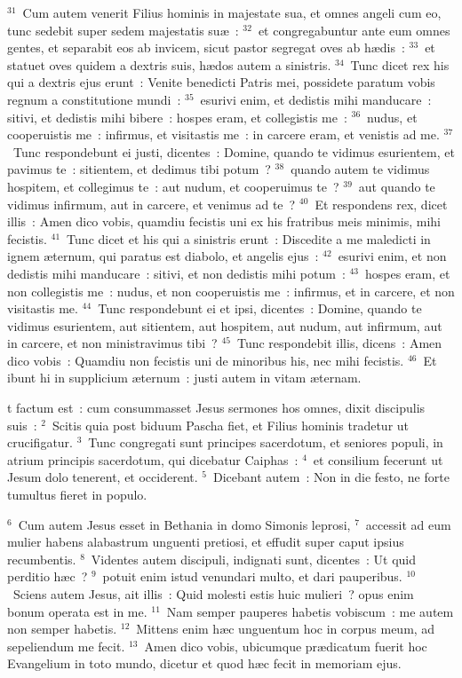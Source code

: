 ${}^{31}$~Cum autem venerit Filius hominis in majestate sua, et omnes angeli cum eo, tunc sedebit super sedem majestatis su\ae~:
${}^{32}$~et congregabuntur ante eum omnes gentes, et separabit eos ab invicem, sicut pastor segregat oves ab h\ae dis~:
${}^{33}$~et statuet oves quidem a dextris suis, h\ae dos autem a sinistris.
${}^{34}$~Tunc dicet rex his qui a dextris ejus erunt~: Venite benedicti Patris mei, possidete paratum vobis regnum a constitutione mundi~:
${}^{35}$~esurivi enim, et dedistis mihi manducare~: sitivi, et dedistis mihi bibere~: hospes eram, et collegistis me~:
${}^{36}$~nudus, et cooperuistis me~: infirmus, et visitastis me~: in carcere eram, et venistis ad me.
${}^{37}$~Tunc respondebunt ei justi, dicentes~: Domine, quando te vidimus esurientem, et pavimus te~: sitientem, et dedimus tibi potum~?
${}^{38}$~quando autem te vidimus hospitem, et collegimus te~: aut nudum, et cooperuimus te~?
${}^{39}$~aut quando te vidimus infirmum, aut in carcere, et venimus ad te~?
${}^{40}$~Et respondens rex, dicet illis~: Amen dico vobis, quamdiu fecistis uni ex his fratribus meis minimis, mihi fecistis.
${}^{41}$~Tunc dicet et his qui a sinistris erunt~: Discedite a me maledicti in ignem \ae ternum, qui paratus est diabolo, et angelis ejus~:
${}^{42}$~esurivi enim, et non dedistis mihi manducare~: sitivi, et non dedistis mihi potum~:
${}^{43}$~hospes eram, et non collegistis me~: nudus, et non cooperuistis me~: infirmus, et in carcere, et non visitastis me.
${}^{44}$~Tunc respondebunt ei et ipsi, dicentes~: Domine, quando te vidimus esurientem, aut sitientem, aut hospitem, aut nudum, aut infirmum, aut in carcere, et non ministravimus tibi~?
${}^{45}$~Tunc respondebit illis, dicens~: Amen dico vobis~: Quamdiu non fecistis uni de minoribus his, nec mihi fecistis.
${}^{46}$~Et ibunt hi in supplicium \ae ternum~: justi autem in vitam \ae ternam.

\bchapter
{}t factum est~: cum consummasset Jesus sermones hos omnes, dixit discipulis suis~:
${}^{2}$~Scitis quia post biduum Pascha fiet, et Filius hominis tradetur ut crucifigatur.
${}^{3}$~Tunc congregati sunt principes sacerdotum, et seniores populi, in atrium principis sacerdotum, qui dicebatur Caiphas~:
${}^{4}$~et consilium fecerunt ut Jesum dolo tenerent, et occiderent.
${}^{5}$~Dicebant autem~: Non in die festo, ne forte tumultus fieret in populo.


${}^{6}$~Cum autem Jesus esset in Bethania in domo Simonis leprosi,
${}^{7}$~accessit ad eum mulier habens alabastrum unguenti pretiosi, et effudit super caput ipsius recumbentis.
${}^{8}$~Videntes autem discipuli, indignati sunt, dicentes~: Ut quid perditio h\ae c~?
${}^{9}$~potuit enim istud venundari multo, et dari pauperibus.
${}^{10}$~Sciens autem Jesus, ait illis~: Quid molesti estis huic mulieri~? opus enim bonum operata est in me.
${}^{11}$~Nam semper pauperes habetis vobiscum~: me autem non semper habetis.
${}^{12}$~Mittens enim h\ae c unguentum hoc in corpus meum, ad sepeliendum me fecit.
${}^{13}$~Amen dico vobis, ubicumque pr\ae dicatum fuerit hoc Evangelium in toto mundo, dicetur et quod h\ae c fecit in memoriam ejus.


